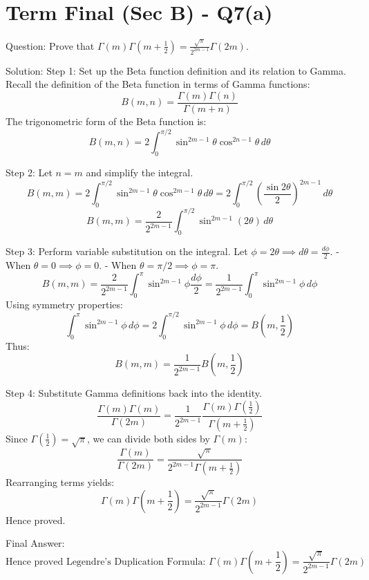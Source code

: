 \documentclass{article}
\begin{document}
\section*{Term Final (Sec B) - Q7(a)}
Question:
Prove that \(\Gamma(m) \Gamma\left(m + \frac{1}{2}\right) = \frac{\sqrt{\pi}}{2^{2m-1}} \Gamma(2m)\).

Solution:
Step 1: Set up the Beta function definition and its relation to Gamma.
Recall the definition of the Beta function in terms of Gamma functions:
\[
B(m, n) = \frac{\Gamma(m)\Gamma(n)}{\Gamma(m+n)}
\]
The trigonometric form of the Beta function is:
\[
B(m, n) = 2 \int_0^{\pi/2} \sin^{2m-1} \theta \cos^{2n-1} \theta \, d\theta
\]

Step 2: Let \(n = m\) and simplify the integral.
\[
B(m, m) = 2 \int_0^{\pi/2} \sin^{2m-1} \theta \cos^{2m-1} \theta \, d\theta = 2 \int_0^{\pi/2} \left( \frac{\sin 2\theta}{2} \right)^{2m-1} \, d\theta
\]
\[
B(m, m) = \frac{2}{2^{2m-1}} \int_0^{\pi/2} \sin^{2m-1} (2\theta) \, d\theta
\]

Step 3: Perform variable substitution on the integral.
Let \(\phi = 2\theta \implies d\theta = \frac{d\phi}{2}\).
- When \(\theta = 0 \implies \phi = 0\).
- When \(\theta = \pi/2 \implies \phi = \pi\).
\[
B(m, m) = \frac{2}{2^{2m-1}} \int_0^\pi \sin^{2m-1} \phi \frac{d\phi}{2} = \frac{1}{2^{2m-1}} \int_0^\pi \sin^{2m-1} \phi \, d\phi
\]
Using symmetry properties:
\[
\int_0^\pi \sin^{2m-1} \phi \, d\phi = 2 \int_0^{\pi/2} \sin^{2m-1} \phi \, d\phi = B\left(m, \frac{1}{2}\right)
\]
Thus:
\[
B(m, m) = \frac{1}{2^{2m-1}} B\left(m, \frac{1}{2}\right)
\]

Step 4: Substitute Gamma definitions back into the identity.
\[
\frac{\Gamma(m)\Gamma(m)}{\Gamma(2m)} = \frac{1}{2^{2m-1}} \frac{\Gamma(m)\Gamma\left(\frac{1}{2}\right)}{\Gamma\left(m + \frac{1}{2}\right)}
\]
Since \(\Gamma\left(\frac{1}{2}\right) = \sqrt{\pi}\), we can divide both sides by \(\Gamma(m)\):
\[
\frac{\Gamma(m)}{\Gamma(2m)} = \frac{\sqrt{\pi}}{2^{2m-1} \Gamma\left(m + \frac{1}{2}\right)}
\]
Rearranging terms yields:
\[
\Gamma(m)\Gamma\left(m + \frac{1}{2}\right) = \frac{\sqrt{\pi}}{2^{2m-1}} \Gamma(2m)
\]
Hence proved.

Final Answer:
\[
\text{Hence proved Legendre's Duplication Formula: } \boxed{\Gamma(m)\Gamma\left(m + \frac{1}{2}\right) = \frac{\sqrt{\pi}}{2^{2m-1}} \Gamma(2m)}
\]

\end{document}

